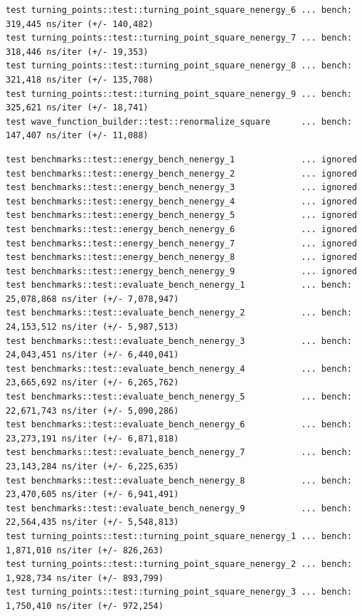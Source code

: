 \documentclass[11pt,DIV=10,final]{scrreprt} %
\begin{document}
{\begin{appendix}
\begin{lstlisting}[caption={
Test run on machine 1, the energy tests were ignored because they take about 2 hours to run.
}]
test turning_points::test::turning_point_square_nenergy_6 ... bench:     319,445 ns/iter (+/- 140,482)
test turning_points::test::turning_point_square_nenergy_7 ... bench:     318,446 ns/iter (+/- 19,353)
test turning_points::test::turning_point_square_nenergy_8 ... bench:     321,418 ns/iter (+/- 135,708)
test turning_points::test::turning_point_square_nenergy_9 ... bench:     325,621 ns/iter (+/- 18,741)
test wave_function_builder::test::renormalize_square      ... bench:     147,407 ns/iter (+/- 11,088)
\end{lstlisting}
\vspace*{3ex}
\begin{lstlisting}[caption={
Test on machine 2 (specs~\ref{specs:m2}).
}]
test benchmarks::test::energy_bench_nenergy_1             ... ignored
test benchmarks::test::energy_bench_nenergy_2             ... ignored
test benchmarks::test::energy_bench_nenergy_3             ... ignored
test benchmarks::test::energy_bench_nenergy_4             ... ignored
test benchmarks::test::energy_bench_nenergy_5             ... ignored
test benchmarks::test::energy_bench_nenergy_6             ... ignored
test benchmarks::test::energy_bench_nenergy_7             ... ignored
test benchmarks::test::energy_bench_nenergy_8             ... ignored
test benchmarks::test::energy_bench_nenergy_9             ... ignored
test benchmarks::test::evaluate_bench_nenergy_1           ... bench:  25,078,868 ns/iter (+/- 7,078,947)
test benchmarks::test::evaluate_bench_nenergy_2           ... bench:  24,153,512 ns/iter (+/- 5,987,513)
test benchmarks::test::evaluate_bench_nenergy_3           ... bench:  24,043,451 ns/iter (+/- 6,440,041)
test benchmarks::test::evaluate_bench_nenergy_4           ... bench:  23,665,692 ns/iter (+/- 6,265,762)
test benchmarks::test::evaluate_bench_nenergy_5           ... bench:  22,671,743 ns/iter (+/- 5,090,286)
test benchmarks::test::evaluate_bench_nenergy_6           ... bench:  23,273,191 ns/iter (+/- 6,871,818)
test benchmarks::test::evaluate_bench_nenergy_7           ... bench:  23,143,284 ns/iter (+/- 6,225,635)
test benchmarks::test::evaluate_bench_nenergy_8           ... bench:  23,470,605 ns/iter (+/- 6,941,491)
test benchmarks::test::evaluate_bench_nenergy_9           ... bench:  22,564,435 ns/iter (+/- 5,548,813)
test turning_points::test::turning_point_square_nenergy_1 ... bench:   1,871,010 ns/iter (+/- 826,263)
test turning_points::test::turning_point_square_nenergy_2 ... bench:   1,928,734 ns/iter (+/- 893,799)
test turning_points::test::turning_point_square_nenergy_3 ... bench:   1,750,410 ns/iter (+/- 972,254)

\end{lstlisting}
\end{appendix}}
\end{document}
